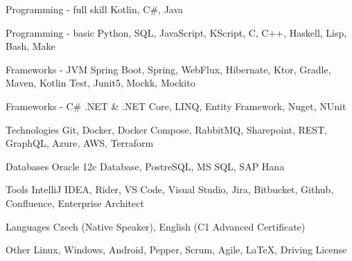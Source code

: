 
\begin{cvskills}

\cvskill
{Programming - full skill}
{Kotlin, C\#, Java}

\cvskill
{Programming - basic}
{Python, SQL, JavaScript, KScript, C, C++, Haskell, Lisp, Bash, Make}

\cvskill
{Frameworks - JVM}
{Spring Boot, Spring, WebFlux, Hibernate, Ktor, Gradle, Maven, Kotlin Test, Junit5, Mockk, Mockito}

\cvskill
{Frameworks - C\#}
{.NET \& .NET Core, LINQ, Entity Framework, Nuget, NUnit}

\cvskill
{Technologies}
{Git, Docker, Docker Compose, RabbitMQ, Sharepoint, REST, GraphQL, Azure, AWS, Terraform}

\cvskill
{Databases}
{Oracle 12c Database, PostreSQL, MS SQL, SAP Hana}

\cvskill
{Tools}
{IntelliJ IDEA, Rider, VS Code, Visual Studio, Jira, Bitbucket, Github, Confluence, Enterprise Architect}

\cvskill
{Languages}
{Czech (Native Speaker), English (C1 Advanced Certificate)}

\cvskill
{Other}
{Linux, Windows, Android, Pepper, Scrum, Agile, LaTeX, Driving License}

\end{cvskills}